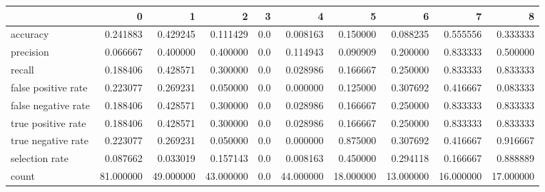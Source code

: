 \begin{tabular}{lrrrrrrrrr}
\toprule
{} &          0 &          1 &          2 &    3 &          4 &          5 &          6 &          7 &          8 \\
\midrule
accuracy            &   0.241883 &   0.429245 &   0.111429 &  0.0 &   0.008163 &   0.150000 &   0.088235 &   0.555556 &   0.333333 \\
precision           &   0.066667 &   0.400000 &   0.400000 &  0.0 &   0.114943 &   0.090909 &   0.200000 &   0.833333 &   0.500000 \\
recall              &   0.188406 &   0.428571 &   0.300000 &  0.0 &   0.028986 &   0.166667 &   0.250000 &   0.833333 &   0.833333 \\
false positive rate &   0.223077 &   0.269231 &   0.050000 &  0.0 &   0.000000 &   0.125000 &   0.307692 &   0.416667 &   0.083333 \\
false negative rate &   0.188406 &   0.428571 &   0.300000 &  0.0 &   0.028986 &   0.166667 &   0.250000 &   0.833333 &   0.833333 \\
true positive rate  &   0.188406 &   0.428571 &   0.300000 &  0.0 &   0.028986 &   0.166667 &   0.250000 &   0.833333 &   0.833333 \\
true negative rate  &   0.223077 &   0.269231 &   0.050000 &  0.0 &   0.000000 &   0.875000 &   0.307692 &   0.416667 &   0.916667 \\
selection rate      &   0.087662 &   0.033019 &   0.157143 &  0.0 &   0.008163 &   0.450000 &   0.294118 &   0.166667 &   0.888889 \\
count               &  81.000000 &  49.000000 &  43.000000 &  0.0 &  44.000000 &  18.000000 &  13.000000 &  16.000000 &  17.000000 \\
\bottomrule
\end{tabular}
